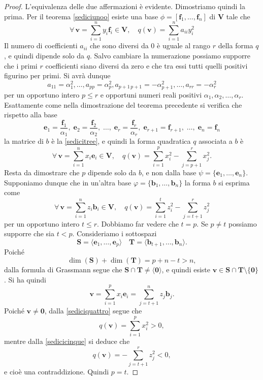 \documentclass{article}
\theoremstyle{plain}
\theoremstyle{definition}
\theoremstyle{remark}
\begin{document}
\begin{proof}
L'equivalenza delle due affermazioni è evidente. Dimostriamo quindi la prima.
Per il teorema \ref{sediciunoo} esiste una base $\phi = [\mathbf{f}_1, \ldots, \mathbf{f}_n]$ di $\mathbf{V}$ tale che
\[\forall\,\mathbf{v} = \sum_{i=1}^{n}y_i\mathbf{f}_i \in \mathbf{V},\quad q(\mathbf{v}) = \sum_{i=1}^{n}a_{ii}y_i^2\]
Il numero di coefficienti $a_{ii}$ che sono diversi da $0$ è uguale al rango $r$ della forma $q$, e quindi dipende solo da $q$. 
Salvo cambiare la numerazione possiamo supporre che i primi $r$ coefficienti siano diversi da zero e che tra essi tutti quelli positivi figurino per primi. Si avrà dunque
\[a_{11} = \alpha_1^2, \ldots, a_{pp} = \alpha_p^2, a_{p+1\,p+1} = -\alpha_{p+1}^2, \ldots, a_{rr} = -\alpha_r^2\]
per un opportuno intero $p \leq r$ e opportuni numeri reali positivi $\alpha_1, \alpha_2, \ldots, \alpha_r$.
Esattamente come nella dimostrazione del teorema precedente si verifica che rispetto alla base
\[\mathbf{e}_1 = \dfrac{\mathbf{f}_1}{\alpha_1},\; \mathbf{e}_2 = \dfrac{\mathbf{f}_2}{\alpha_2},\; \ldots,\; \mathbf{e}_r = \dfrac{\mathbf{f}_r}{\alpha_r},\; \mathbf{e}_{r+1} = \mathbf{f}_{r+1},\; \ldots,\; \mathbf{e}_n = \mathbf{f}_n\]
la matrice di $b$ è la \ref{sedicitree}, e quindi la forma quadratica $q$ associata a $b$ è
\begin{equation}\label{sediciquattro}
\forall\,\mathbf{v} = \sum_{i=1}^{n}x_i\mathbf{e}_i \in \mathbf{V},\quad q(\mathbf{v}) = \sum_{i=1}^{p}x_i^2-\sum_{j=p+1}^{r}x_j^2.
\end{equation}
Resta da dimostrare che $p$ dipende solo da $b$, e non dalla base $\psi=\{\mathbf{e}_1, \ldots, \mathbf{e}_n\}$. Supponiamo 
dunque che in un'altra base $\varphi = \{\mathbf{b}_1, \ldots, \mathbf{b}_n\}$ la forma $b$ si esprima come
\begin{equation}\label{sedicicinque}
\forall\,\mathbf{v} = \sum_{i=1}^{n}z_i\mathbf{b}_i \in \mathbf{V},\quad q(\mathbf{v}) = \sum_{i=1}^{t}z_i^2 - \sum_{j=t+1}^{r}z_j^2
\end{equation}
per un opportuno intero $t \leq r$. Dobbiamo far vedere che $t = p$. Se $p \neq t$ possiamo supporre che sia $t < p$. Consideriamo i sottospazi
\[\mathbf{S} = \langle\mathbf{e}_1, \ldots, \mathbf{e}_p\rangle \quad \mathbf{T} = \langle\mathbf{b}_{t+1}, \ldots, \mathbf{b}_n\rangle.\]
Poiché
\[\dim(\mathbf{S}) + \dim(\mathbf{T}) = p + n - t > n,\]
dalla formula di Grassmann segue che $\mathbf{S} \cap \mathbf{T} \neq \langle\mathbf{0}\rangle$, e quindi esiste 
$\mathbf{v} \in \mathbf{S} \cap \mathbf{T}\setminus\{\mathbf{0}\}$. Si ha quindi
\begin{equation}
\mathbf{v} = \sum_{i=1}^{p}x_i\mathbf{e}_i = \sum_{j=t+1}^{n}z_j\mathbf{b}_j.
\end{equation}
Poiché $\mathbf{v} \neq \mathbf{0}$, dalla \ref{sediciquattro} segue che
\[q(\mathbf{v}) = \sum_{i=1}^{p}x_i^2> 0,\]
mentre dalla \ref{sedicicinque} si deduce che
\begin{equation}
q(\mathbf{v}) = -\sum_{j=t+1}^{r}z_j^2 < 0,
\end{equation}
e cioè una contraddizione. Quindi $p = t$.    
\end{proof}
\end{document}
